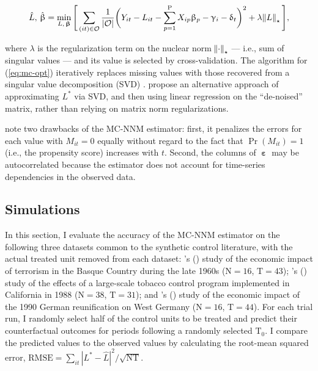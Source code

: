 \documentclass[hidelinks,12pt]{article}
\newcommand{\possessivecite}[1]{\citeauthor{#1}'s (\citeyear{#1})}
\begin{document}
\begin{equation}
\hat{L}, \, \hat{\upbeta} = \min_{L, \,\boldsymbol{\upbeta}} \Bigg[\sum_{(it) \in \mathcal{O}} \frac{1}{|\mathcal{O}|} \bigg(Y_{it} - L_{it} - \sum_{p=1}^{\text{P}} X_{ip} \upbeta_p - \upgamma_{i} - \updelta_{t} \bigg)^2 + \lambda \norm{L}_\star \Bigg], \label{eq:mc-opt}
\end{equation}

\noindent
where $\lambda$ is the regularization term on the nuclear norm $\norm{\cdot}_\star$ --- i.e., sum of singular values --- and its value is selected by cross-validation. The algorithm for (\ref{eq:mc-opt}) iteratively replaces missing values with those recovered from a singular value decomposition (SVD) \citep{mazumder2010spectral}. \citet{amjad2018robust} propose an alternative approach of approximating $L^{*}$ via SVD, and then using linear regression on the ``de-noised'' matrix, rather than relying on matrix norm regularizations.

\citet{athey2017matrix} note two drawbacks of the MC-NNM estimator: first, it penalizes the errors for each value with $M_{it} = 0$ equally without regard to the fact that $\Pr (M_{it}) = 1$ (i.e., the propensity score) increases with $t$. Second, the columns of $\boldsymbol{\upepsilon}$ may be autocorrelated because the estimator does not account for time-series dependencies in the observed data.

\subsection{Simulations} \label{sims}

In this section, I evaluate the accuracy of the MC-NNM estimator on the following three datasets common to the synthetic control literature, with the actual treated unit removed from each dataset: \possessivecite{abadie2003economic} study of the economic impact of terrorism in the Basque Country during the late 1960s ($\text{N}=16$, $\text{T}=43$); \possessivecite{abadie2010synthetic} study of the effects of a large-scale tobacco control program implemented in California in 1988 ($\text{N}=38$, $\text{T}=31$); and \possessivecite{abadie2015comparative} study of the economic impact of the 1990 German reunification on West Germany ($\text{N}=16$, $\text{T}=44$). For each trial run, I randomly select half of the control units to be treated and predict their counterfactual outcomes for periods following a randomly selected $\text{T}_0$. I compare the predicted values to the observed values by calculating the root-mean squared error, $\text{RMSE} = \sum_{it}|L^{*} -\hat{L}|^2 / \sqrt{\text{NT}}$. 
\end{document}
